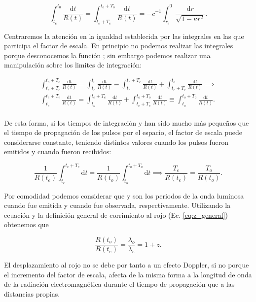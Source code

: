 \begin{equation*}
    \int_{t_e}^{t_0} \frac{\mathrm d t }{R(t)}=\int_{t_e+T_e}^{t_o+T_o} \frac{\mathrm d t }{R(t)}=-{c}^{-1}\int_{r_e}^{0} \frac{\mathrm d r}{\sqrt{1-\kappa {r}^{2}}}.
\end{equation*}

Centraremos la atención en la igualdad establecida por las integrales en las que participa el factor de escala. En principio no podemos realizar las integrales porque desconocemos la función ; sin embargo podemos realizar una manipulación sobre los limites de integración:

\begin{align*}
    \int_{t_e+T_e}^{t_o+T_o} \frac{\mathrm d t }{R(t)} =\int_{t_e}^{t_0} \frac{\mathrm d t }{R(t)}\equiv \int_{t_e}^{t_e+ T_e} \frac{\mathrm d t }{R(t)} + \int_{t_e+T_e}^{t_o} \frac{\mathrm d t }{R(t)} \implies \nonumber\\
    \int_{t_e}^{t_e+T_e} \frac{\mathrm d t }{R(t)}= \int_{t_o}^{t_e+ T_e} \frac{\mathrm d t }{R(t)} + \int_{t_e+T_e}^{t_o+T_o} \frac{\mathrm d t }{R(t)} \equiv  \int_{t_o}^{t_o+T_o} \frac{\mathrm d t }{R(t)}. \nonumber \\
\end{align*}

De esta forma, si los tiempos de integración  y  han sido mucho más pequeños que el tiempo de propagación de los pulsos por el espacio, el factor de escala puede considerarse constante, teniendo distintos valores cuando los pulsos fueron emitidos y cuando fueron recibidos:

\begin{equation*}
    \frac{1}{R(t_e)}\int_{t_e}^{t_e+T_e} \mathrm d t = \frac{1}{R(t_o)} \int_{t_o}^{t_o + T_o} \mathrm d t \implies \frac{T_e}{R(t_e)}=\frac{T_o}{R(t_o)}.
\end{equation*}

Por comodidad podemos considerar que  y  son los periodos de la onda luminosa cuando fue emitida y cuando fue observada, respectivamente. Utilizando la ecuación  y la definición general de corrimiento al rojo (Ec. \ref{eq:z_general}) obtenemos que

\begin{equation}\label{eq:metrica_vs_z}
    \frac{R(t_o)}{R(t_e)}=\frac{\lambda_o}{\lambda_e}=1+z.
\end{equation}

El desplazamiento al rojo no se debe por tanto a un efecto Doppler, si no porque el incremento del factor de escala, afecta de la misma forma a la longitud de onda de la radiación electromagnética durante el tiempo de propagación que a las distancias propias.

